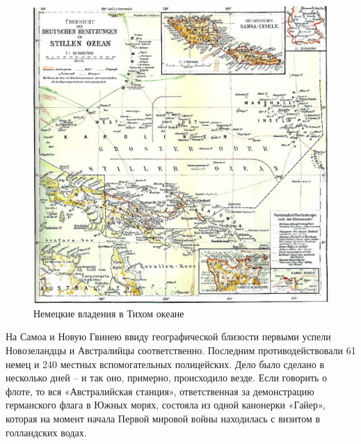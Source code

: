 \begin{figure}[h!tb] 
	\centering\includegraphics[scale=0.4]{Glava3/Ws5-lBsrvxc.jpg}
	\caption{Немецкие владения в Тихом океане}%
\end{figure}

На Самоа и Новую Гвинею ввиду географической близости первыми успели Новозеландцы и Австралийцы соответственно. Последним противодействовали 61 немец и 240 местных вспомогательных полицейских. Дело было сделано в несколько дней – и так оно, примерно, происходило везде. Если говорить о флоте, то вся «Австралийская станция», ответственная за демонстрацию германского флага в Южных морях, состояла из одной канонерки «Гайер», которая на момент начала Первой мировой войны находилась с визитом в голландских водах.

